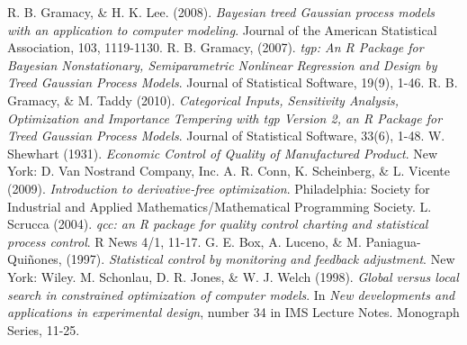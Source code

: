 \documentclass[12pt]{article}
\begin{document}
	
% 

\begin{thebibliography}{2}
 R. B. Gramacy, \& H. K. Lee. (2008). {\em Bayesian treed Gaussian process models with an application to computer modeling}. Journal of the American Statistical Association, 103, 1119-1130.
 R. B. Gramacy, (2007). {\em tgp: An R Package for Bayesian Nonstationary, Semiparametric Nonlinear Regression and Design by Treed Gaussian Process Models}. Journal of Statistical Software, 19(9), 1-46. %
 R. B. Gramacy, \& M. Taddy (2010). {\em Categorical Inputs, Sensitivity Analysis, Optimization and Importance Tempering with tgp Version 2, an R Package for Treed Gaussian Process Models}. Journal of Statistical Software, 33(6), 1-48. %
 W. Shewhart (1931). {\em Economic Control of Quality of Manufactured Product}. New York: D. Van Nostrand Company, Inc. 
 A. R. Conn, K. Scheinberg, \& L. Vicente (2009). {\em Introduction to derivative-free optimization}. Philadelphia: Society for Industrial and Applied Mathematics/Mathematical Programming Society.
 L. Scrucca (2004). {\em qcc: an R package for quality control charting and statistical process control}. R News 4/1, 11-17.
 G. E. Box, A. Luceno, \& M. Paniagua-Qui\~{n}ones, (1997). {\em Statistical control by monitoring and feedback adjustment}. New York: Wiley.
 M. Schonlau, D. R. Jones, \& W. J. Welch (1998). {\em Global versus local search in constrained optimization of computer models}. In {\em New developments and applications in experimental design}, number 34 in IMS Lecture Notes. Monograph Series, 11-25.
\end{thebibliography}
\end{document}
